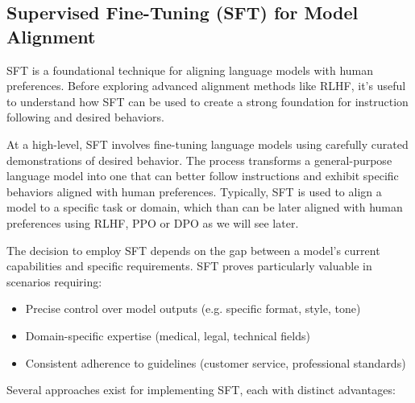 \subsection{Supervised Fine-Tuning (SFT) for Model Alignment}

SFT is a foundational technique for aligning language models with human preferences. Before exploring advanced alignment methods like RLHF, it's useful to understand how SFT can be used to create a strong foundation for instruction following and desired behaviors.

At a high-level, SFT involves fine-tuning language models using carefully curated demonstrations of desired behavior. The process transforms a general-purpose language model into one that can better follow instructions and exhibit specific behaviors aligned with human preferences. Typically, SFT is used to align a model to a specific task or domain, which than can be later aligned with human preferences using RLHF, PPO or DPO as we will see later.

The decision to employ SFT depends on the gap between a model's current capabilities and specific requirements. SFT proves particularly valuable in scenarios requiring:

\begin{itemize}
\item Precise control over model outputs (e.g. specific format, style, tone)
\item Domain-specific expertise (medical, legal, technical fields)
\item Consistent adherence to guidelines (customer service, professional standards)
\end{itemize}

Several approaches exist for implementing SFT, each with distinct advantages:

